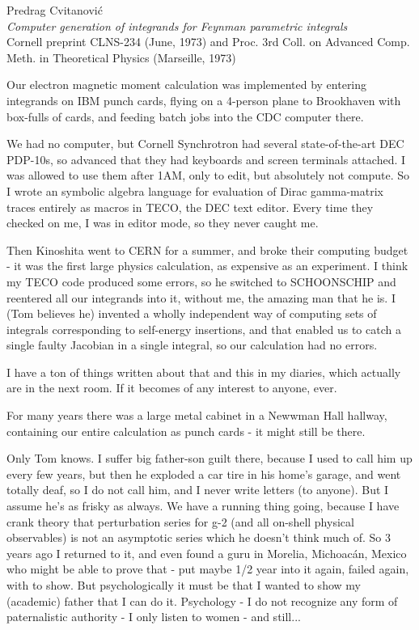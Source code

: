 \begin{description}
Predrag Cvitanovi\'c\\
{\em Computer generation of integrands for Feynman parametric integrals}\\
Cornell preprint CLNS-234 (June, 1973)
and Proc. 3rd Coll. on Advanced Comp. Meth. in Theoretical Physics
(Marseille, 1973)

Our electron magnetic moment calculation was implemented by entering integrands on IBM punch cards, flying on a 4-person plane to Brookhaven with box-fulls of cards, and feeding batch jobs into the CDC computer there.

We had no computer, but Cornell Synchrotron had several state-of-the-art DEC PDP-10s, so advanced that they had keyboards and screen terminals attached. I was allowed to use them after 1AM, only to edit, but absolutely not compute. So I wrote an symbolic algebra language for evaluation of Dirac gamma-matrix traces entirely as macros in TECO, the DEC text editor. Every time they checked on me, I was in editor mode, so they never caught me.

Then Kinoshita went to CERN for a summer, and broke their computing budget - it was the first large physics calculation, as expensive as an experiment. I think my TECO code produced some errors, so he switched to SCHOONSCHIP and reentered all our integrands into it, without me, the amazing man that he is. I (Tom believes he) invented a wholly independent way of computing sets of integrals corresponding to self-energy insertions, and that enabled us to catch a single faulty Jacobian in a single integral, so our calculation had no errors.

I have a ton of things written about that and this in my diaries, which actually are in the next room. If it becomes of any interest to anyone, ever.

For many years there was a large metal cabinet in a Newwman Hall hallway, containing our entire calculation as punch cards - it might still be there.

Only Tom knows. I suffer big father-son guilt there, because I used to call him up every few years, but then he exploded a car tire in his home's garage, and went totally deaf, so I do not call him, and I never write letters (to anyone). But I assume he's as frisky as always. We have a running thing going, because I have crank theory that perturbation series for g-2 (and all on-shell physical observables) is not an asymptotic series which he doesn't think much of. So 3 years ago I returned to it, and even found a guru in Morelia, Michoacán, Mexico who might be able to prove that - put maybe 1/2 year into it again, failed again, with to show. But psychologically it must be that I wanted to show my (academic) father that I can do it. Psychology - I do not recognize any form of paternalistic authority - I only listen to women - and still...


\end{description}
